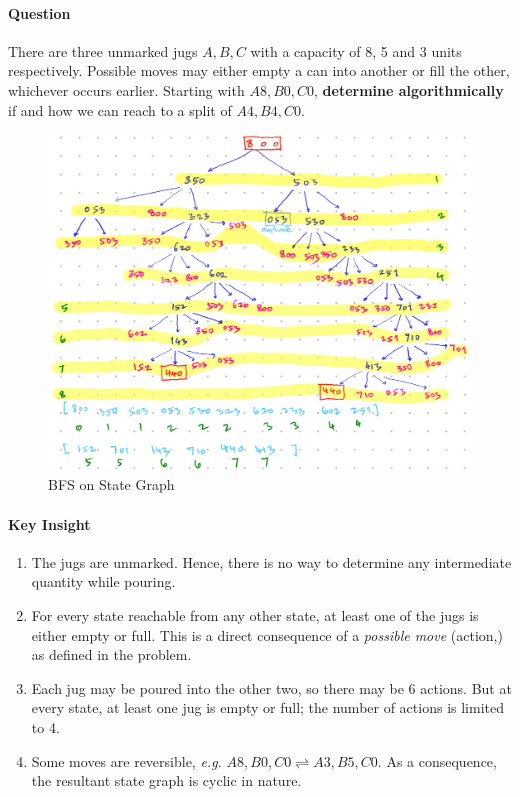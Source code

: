 \documentclass[11pt]{article}
\begin{document}
\paragraph*{Question}
\label{sec:org253665e}

There are three unmarked jugs \(A,B,C\) with a capacity
of 8, 5 and 3 units respectively.  Possible moves may
either empty a can into another or fill the other,
whichever occurs earlier.  Starting with \(A8,B0,C0\),
\textbf{determine algorithmically} if and how we can reach to
a split of \(A4,B4,C0\).

\begin{figure}[!h]
\centering
\includegraphics[width=.9\linewidth]{images/bfsOnStateGraph.png}
\caption{\label{fig:bfsOnStateGraph}BFS on State Graph}
\end{figure}

\paragraph*{Key Insight}
\label{sec:orgf02d0b9}
\begin{enumerate}
\item The jugs are unmarked.  Hence, there is no way to
determine any intermediate quantity while pouring.
\item For every state reachable from any other state, at
least one of the jugs is either empty or full.  This
is a direct consequence of a \emph{possible move}
(action,) as defined in the problem.
\item Each jug may be poured into the other two, so there
may be 6 actions.  But at every state, at least one
jug is empty or full; the number of actions is
limited to 4.
\item Some moves are reversible, \emph{e.g.} \(A8,B0,C0
   \rightleftharpoons A3,B5,C0\).  As a consequence, the
resultant state graph is cyclic in nature.
\end{enumerate}
\end{document}
